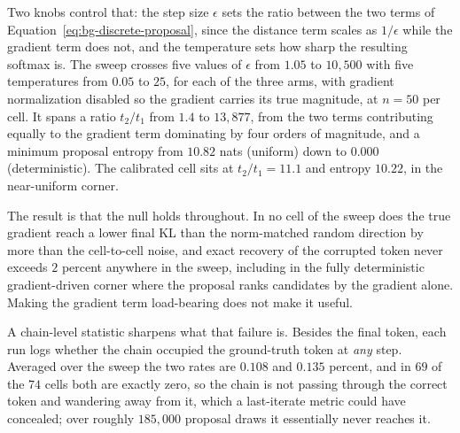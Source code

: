 Two knobs control that: the step size $\epsilon$ sets the ratio between the two terms of Equation~\eqref{eq:bg-discrete-proposal}, since the distance term scales as $1/\epsilon$ while the gradient term does not, and the temperature sets how sharp the resulting softmax is. The sweep crosses five values of $\epsilon$ from $1.05$ to $10{,}500$ with five temperatures from $0.05$ to $25$, for each of the three arms, with gradient normalization disabled so the gradient carries its true magnitude, at $n = 50$ per cell. It spans a ratio $t_2/t_1$ from $1.4$ to $13{,}877$, from the two terms contributing equally to the gradient term dominating by four orders of magnitude, and a minimum proposal entropy from $10.82$ nats (uniform) down to $0.000$ (deterministic). The calibrated cell sits at $t_2/t_1 = 11.1$ and entropy $10.22$, in the near-uniform corner.

The result is that the null holds throughout. In no cell of the sweep does the true gradient reach a lower final KL than the norm-matched random direction by more than the cell-to-cell noise, and exact recovery of the corrupted token never exceeds $2$ percent anywhere in the sweep, including in the fully deterministic gradient-driven corner where the proposal ranks candidates by the gradient alone. Making the gradient term load-bearing does not make it useful.

A chain-level statistic sharpens what that failure is. Besides the final token, each run logs whether the chain occupied the ground-truth token at \emph{any} step. Averaged over the sweep the two rates are $0.108$ and $0.135$ percent, and in $69$ of the $74$ cells both are exactly zero, so the chain is not passing through the correct token and wandering away from it, which a last-iterate metric could have concealed; over roughly $185{,}000$ proposal draws it essentially never reaches it.

